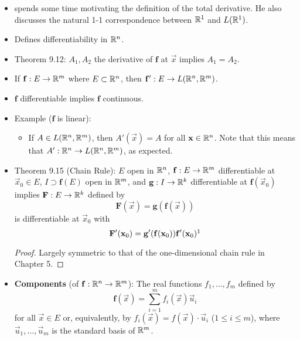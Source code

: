 \documentclass[../notes.tex]{subfiles}
\begin{document}
\begin{itemize}
    \item \textcite{bib:Rudin} spends some time motivating the definition of the total derivative. He also discusses the natural 1-1 correspondence between $\mathbb{R}^1$ and $L(\mathbb{R}^1)$.
    \item Defines differentiability in $\mathbb{R}^n$.
    \item Theorem 9.12: $A_1,A_2$ the derivative of $\mathbf{f}$ at $\vec{x}$ implies $A_1=A_2$.
    \item If $\mathbf{f}:E\to\mathbb{R}^m$ where $E\subset\mathbb{R}^n$, then $\mathbf{f}':E\to L(\mathbb{R}^n,\mathbb{R}^m)$.
    \item $\mathbf{f}$ differentiable implies $\mathbf{f}$ continuous.
    \item Example ($\mathbf{f}$ is linear):
    \begin{itemize}
        \item If $A\in L(\mathbb{R}^n,\mathbb{R}^m)$, then $A'(\vec{x})=A$ for all $\mathbf{x}\in\mathbb{R}^n$. Note that this means that $A':\mathbb{R}^n\to L(\mathbb{R}^n,\mathbb{R}^m)$, as expected.
    \end{itemize}
    \item Theorem 9.15 (Chain Rule): $E$ open in $\mathbb{R}^n$, $\mathbf{f}:E\to\mathbb{R}^m$ differentiable at $\vec{x}_0\in E$, $I\supset\mathbf{f}(E)$ open in $\mathbb{R}^m$, and $\mathbf{g}:I\to\mathbb{R}^k$ differentiable at $\mathbf{f}(\vec{x}_0)$ implies $\mathbf{F}:E\to\mathbb{R}^k$ defined by
    \begin{equation*}
        \mathbf{F}(\vec{x}) = \mathbf{g}(\mathbf{f}(\vec{x}))
    \end{equation*}
    is differentiable at $\vec{x}_0$ with
    \begin{equation*}
        \mathbf{F}'(\vec{x}_0) = \mathbf{g}'(\mathbf{f}(\vec{x}_0))\mathbf{f}'(\vec{x}_0)\footnotemark
    \end{equation*}
    \begin{proof}
        Largely symmetric to that of the one-dimensional chain rule in Chapter 5.
    \end{proof}
    \item \textbf{Components} (of $\mathbf{f}:\mathbb{R}^n\to\mathbb{R}^m$): The real functions $f_1,\dots,f_m$ defined by
    \begin{equation*}
        \mathbf{f}(\vec{x}) = \sum_{i=1}^mf_i(\vec{x})\vec{u}_i
    \end{equation*}
    for all $\vec{x}\in E$ or, equivalently, by $f_i(\vec{x})=f(\vec{x})\cdot\vec{u}_i$ ($1\leq i\leq m$), where $\vec{u}_1,\dots,\vec{u}_m$ is the standard basis of $\mathbb{R}^m$.

\end{itemize}
\end{document}
